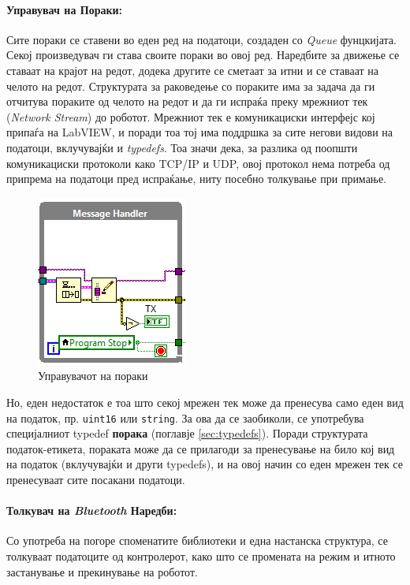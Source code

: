 \documentclass[12pt]{article}
\begin{document}
    \bigbreak

    \paragraph{Управувач на Пораки:\\} %
      \label{sec:message_handler}
      Сите пораки се ставени во еден ред на податоци, создаден со \textit{Queue} фунцкијата. Секој произведувач ги става своите пораки во овој ред. Наредбите за движење се ставаат на крајот на редот, додека другите се сметаат за итни и се ставаат на челото на редот. Структурата за раковедење со пораките има за задача да ги отчитува пораките од челото на редот и да ги испраќа преку мрежниот тек (\textit{Network Stream}) до роботот. Мрежниот тек е комуникациски интерфејс кој припаѓа на LabVIEW, и поради тоа тој има поддршка за сите негови видови на податоци, вклучувајќи и \textit{typedefs}. Тоа значи дека, за разлика од поопшти комуникациски протоколи како TCP/IP и UDP, овој протокол нема потреба од припрема на податоци пред испраќање, ниту посебно толкување при примање.

      \begin{figure}[H]
        \centering
        \includegraphics[width=0.35\linewidth]{./images/message_handler.png}
        \caption{Управувачот на пораки}
        \end{figure}

      Но, еден недостаток е тоа што секој мрежен тек може да пренесува само еден вид на податок, пр. \verb+uint16+ или \verb+string+. За ова да се заобиколи, се употребува специјалниот typedef \textbf{порака} (поглавје \ref{sec:typedefs}). Поради структурата податок-етикета, пораката може да се прилагоди за пренесување на било кој вид на податок (вклучувајќи и други typedefs), и на овој начин со еден мрежен тек се пренесуваат сите посакани податоци.

    \paragraph{Толкувач на \textit{Bluetooth} Наредби:\\}
      Со употреба на погоре споменатите библиотеки и една настанска структура, се толкуваат податоците од контролерот, како што се промената на режим и итното застанување и прекинување на роботот.
\end{document}
